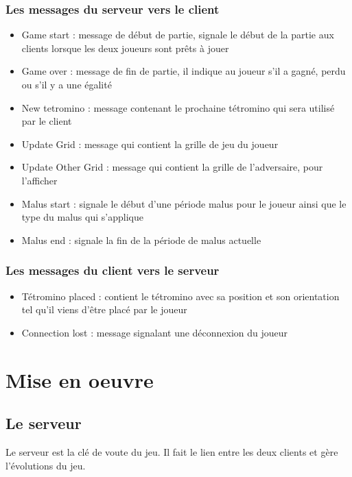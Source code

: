 \documentclass[a4paper, 12pt]{article}
\begin{document}
			\subsubsection{Les messages du serveur vers le client}

				\begin{itemize}
					\item Game start : message de début de partie, signale le début de la partie aux clients lorsque les deux joueurs sont prêts à jouer
					\item Game over : message de fin de partie, il indique au joueur s'il a gagné, perdu ou s'il y a une égalité
					\item New tetromino : message contenant le prochaine tétromino qui sera utilisé par le client
					\item Update Grid : message qui contient la grille de jeu du joueur
					\item Update Other Grid : message qui contient la grille de l'adversaire, pour l'afficher
					\item Malus start : signale le début d'une période malus pour le joueur ainsi que le type du malus qui s'applique
					\item Malus end : signale la fin de la période de malus actuelle
				\end{itemize}

			\subsubsection{Les messages du client vers le serveur}

				\begin{itemize}
					\item Tétromino placed : contient le tétromino avec sa position et son orientation tel qu'il viens d'être placé par le joueur
					\item Connection lost : message signalant une déconnexion du joueur
				\end{itemize}




\section{Mise en oeuvre}
	\subsection{Le serveur}

		Le serveur est la clé de voute du jeu. Il fait le lien entre les deux clients et gère l'évolutions du jeu.
\end{document}
